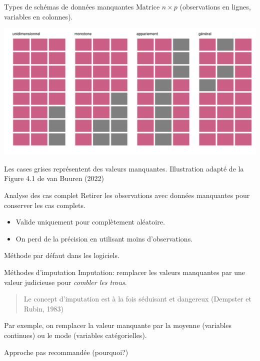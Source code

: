 \documentclass[
  ignorenonframetext,
]{beamer}
\providecommand{\tightlist}{%
  \setlength{\itemsep}{0pt}\setlength{\parskip}{0pt}}\usepackage{longtable,booktabs,array}
\begin{document}
\begin{frame}{Types de schémas de données manquantes}
\protect\hypertarget{types-de-schuxe9mas-de-donnuxe9es-manquantes}{}
Matrice \(n \times p\) (observations en lignes, variables en colonnes).

\includegraphics[width=1\textwidth,height=\textheight]{MATH60602-diapos1_files/figure-beamer/unnamed-chunk-15-1.pdf}

\footnotesize

Les cases grises représentent des valeurs manquantes. Illustration
adapté de la Figure 4.1 de van Buuren (2022)
\end{frame}

\begin{frame}{Analyse des cas complet}
\protect\hypertarget{analyse-des-cas-complet}{}
Retirer les observations avec données manquantes pour conserver les cas
complets.

\begin{itemize}
\tightlist
\item
  Valide uniquement pour complètement aléatoire.
\item
  On perd de la précision en utilisant moins d'observations.
\end{itemize}

Méthode par défaut dans les logiciels.
\end{frame}

\begin{frame}{Méthodes d'imputation}
\protect\hypertarget{muxe9thodes-dimputation}{}
Imputation: remplacer les valeurs manquantes par une valeur judicieuse
pour \emph{combler les trous}.

\begin{quote}
Le concept d'imputation est à la fois séduisant et dangereux (Dempster
et Rubin, 1983)
\end{quote}

Par exemple, on remplacer la valeur manquante par la moyenne (variables
continues) ou le mode (variables catégorielles).

Approche pas recommandée (pourquoi?)
\end{frame}
\end{document}
